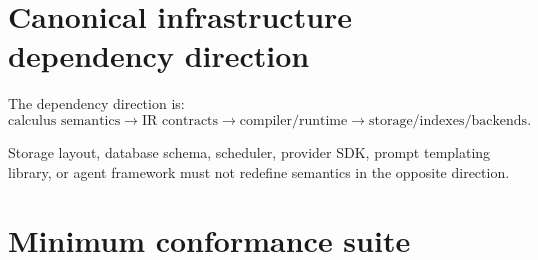 \documentclass[11pt,oneside]{article}
\begin{document}
\section{Canonical infrastructure dependency direction}

The dependency direction is:
\[
\boxed{
\text{calculus semantics}
\to
\text{IR contracts}
\to
\text{compiler/runtime}
\to
\text{storage/indexes/backends}.
}
\]

Storage layout, database schema, scheduler, provider SDK, prompt templating library, or agent framework must not redefine semantics in the opposite direction.

\section{Minimum conformance suite}
\end{document}
